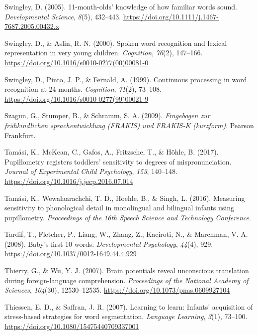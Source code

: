 \documentclass[
  12pt,
  b5paperpaper,
  twoside]{scrreprt}
\newlength{\cslhangindent}
\newlength{\cslentryspacingunit} %
\newenvironment{CSLReferences}[2] %
 {%
  \setlength{\parindent}{0pt}
  \ifodd #1
  \let\oldpar\par
  \def\par{\hangindent=\cslhangindent\oldpar}
  \fi
  \setlength{\parskip}{#2\cslentryspacingunit}
 }%
 {}
\begin{document}
\begin{CSLReferences}{1}{0}
\leavevmode{}%
Swingley, D. (2005). 11-month-olds' knowledge of how familiar words
sound. \emph{Developmental Science}, \emph{8}(5), 432--443.
\url{https://doi.org/10.1111/j.1467-7687.2005.00432.x}

\leavevmode{}%
Swingley, D., \& Aslin, R. N. (2000). Spoken word recognition and
lexical representation in very young children. \emph{Cognition},
\emph{76}(2), 147--166.
\url{https://doi.org/10.1016/s0010-0277(00)00081-0}

\leavevmode{}%
Swingley, D., Pinto, J. P., \& Fernald, A. (1999). Continuous processing
in word recognition at 24 months. \emph{Cognition}, \emph{71}(2),
73--108. \url{https://doi.org/10.1016/s0010-0277(99)00021-9}

\leavevmode{}%
Szagun, G., Stumper, B., \& Schramm, S. A. (2009). \emph{Fragebogen zur
fr{ü}hkindlichen sprachentwicklung ({FRAKIS}) und {FRAKIS-K}
(kurzform)}. {Pearson Frankfurt}.

\leavevmode{}%
Tamási, K., McKean, C., Gafos, A., Fritzsche, T., \& Höhle, B. (2017).
Pupillometry registers toddlers' sensitivity to degrees of
mispronunciation. \emph{Journal of Experimental Child Psychology},
\emph{153}, 140--148. \url{https://doi.org/10.1016/j.jecp.2016.07.014}

\leavevmode{}%
Tamási, K., Wewalaarachchi, T. D., Hoehle, B., \& Singh, L. (2016).
Measuring sensitivity to phonological detail in monolingual and
bilingual infants using pupillometry. \emph{Proceedings of the 16th
{Speech Science} and {Technology Conference}}.

\leavevmode{}%
Tardif, T., Fletcher, P., Liang, W., Zhang, Z., Kaciroti, N., \&
Marchman, V. A. (2008). Baby's first 10 words. \emph{Developmental
Psychology}, \emph{44}(4), 929.
\url{https://doi.org/10.1037/0012-1649.44.4.929}

\leavevmode{}%
Thierry, G., \& Wu, Y. J. (2007). Brain potentials reveal unconscious
translation during foreign-language comprehension. \emph{Proceedings of
the National Academy of Sciences}, \emph{104}(30), 12530--12535.
\url{https://doi.org/10.1073/pnas.0609927104}

\leavevmode{}%
Thiessen, E. D., \& Saffran, J. R. (2007). Learning to learn: Infants'
acquisition of stress-based strategies for word segmentation.
\emph{Language Learning}, \emph{3}(1), 73--100.
\url{https://doi.org/10.1080/15475440709337001}


\end{CSLReferences}
\end{document}
